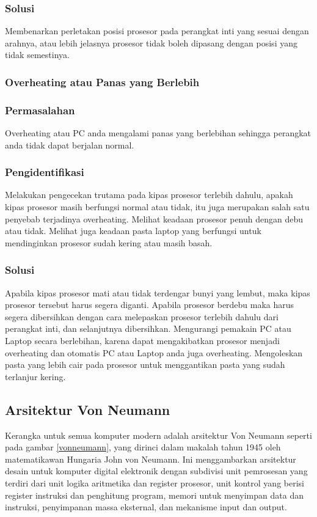 	\subsubsection{Solusi}
Membenarkan perletakan posisi prosesor pada perangkat inti yang sesuai dengan arahnya, atau lebih jelasnya prosesor tidak boleh
dipasang dengan posisi yang tidak semestinya.

\subsubsection{Overheating atau Panas yang Berlebih}
	\subsubsection{Permasalahan}
Overheating atau PC anda mengalami panas yang berlebihan sehingga perangkat anda tidak dapat berjalan normal.
	\subsubsection{Pengidentifikasi}
Melakukan pengecekan trutama pada kipas prosesor terlebih dahulu, apakah kipas prosesor masih berfungsi normal atau tidak, itu
juga merupakan salah satu penyebab terjadinya overheating. Melihat keadaan prosesor penuh dengan debu atau tidak. Melihat juga
keadaan pasta laptop yang berfungsi untuk mendinginkan prosesor sudah kering atau masih basah.
	\subsubsection{Solusi}
Apabila kipas prosesor mati atau tidak terdengar bunyi yang lembut, maka kipas prosesor tersebut harus segera diganti. Apabila
prosesor berdebu maka harus segera dibersihkan dengan cara melepaskan prosesor terlebih dahulu dari perangkat inti, dan
selanjutnya dibersihkan. Mengurangi pemakain PC atau Laptop secara berlebihan, karena dapat mengakibatkan prosesor menjadi
overheating dan otomatis PC atau Laptop anda juga overheating. Mengoleskan pasta yang lebih cair pada prosesor untuk 
menggantikan pasta yang sudah terlanjur kering.

\subsection{Arsitektur Von Neumann}
Kerangka untuk semua komputer modern adalah arsitektur Von Neumann seperti pada gambar \ref{vonneumann}, yang dirinci dalam makalah tahun 1945 oleh matematikawan Hungaria John von Neumann. Ini menggambarkan arsitektur desain untuk komputer digital elektronik dengan subdivisi unit pemrosesan yang terdiri dari unit logika aritmetika dan register prosesor, unit kontrol yang berisi register instruksi dan penghitung program, memori untuk menyimpan data dan instruksi, penyimpanan massa eksternal, dan mekanisme input dan output. 

